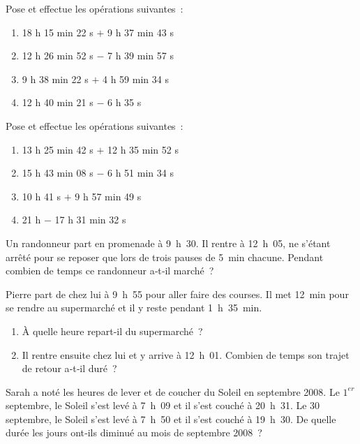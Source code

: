 

\begin{exercice}
Pose et effectue les opérations suivantes :
\begin{enumerate} 
 \item 18 h 15 min 22 s $+$ 9 h 37 min 43 s
 \item 12 h 26 min 52 s $-$ 7 h 39 min 57 s
 \item 9 h 38 min 22 s $+$ 4 h 59 min 34 s
 \item 12 h 40 min 21 s $-$ 6 h 35 s
 \end{enumerate}
\end{exercice}


\begin{exercice}
Pose et effectue les opérations suivantes :
\begin{enumerate} 
 \item 13 h 25 min 42 s $+$ 12 h 35 min 52 s
 \item 15 h 43 min 08 s $-$ 6 h 51 min 34 s
 \item 10 h 41 s $+$ 9 h 57 min 49 s
 \item 21 h $-$ 17 h 31 min 32 s
 \end{enumerate}
\end{exercice}


\begin{exercice}
Un randonneur part en promenade à 9 h 30. Il rentre à 12 h 05, ne s'étant arrêté pour se reposer que lors de trois pauses de 5 min chacune. Pendant combien de temps ce randonneur a‑t‑il marché ?
\end{exercice}


\begin{exercice}
Pierre part de chez lui à 9 h 55 pour aller faire des courses. Il met 12 min pour se rendre au supermarché et il y reste pendant 1 h 35 min.
\begin{enumerate} 
 \item À quelle heure repart‑il du supermarché ?
 \item Il rentre ensuite chez lui et y arrive à 12 h 01. Combien de temps son trajet de retour a‑t‑il duré ?
 \end{enumerate}
\end{exercice}


\begin{exercice}
Sarah a noté les heures de lever et de coucher du Soleil en septembre 2008. Le $1^{er}$ septembre, le Soleil s'est levé à 7 h 09 et il s'est couché à 20 h 31. Le 30 septembre, le Soleil s'est levé à 7 h 50 et il s'est couché à 19 h 30. De quelle durée les jours ont‑ils diminué au mois de septembre 2008 ?
\end{exercice}
 